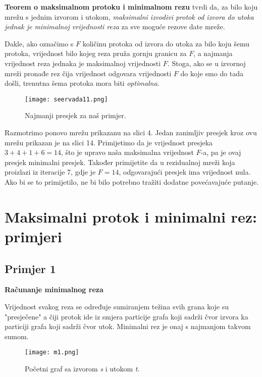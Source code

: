 \documentclass[11pt, a4paper]{article}
\begin{document}
	\textbf{Teorem o maksimalnom protoku i minimalnom rezu} tvrdi da, za bilo koju mrežu s jednim izvorom i utokom, \textit{maksimalni izvodivi protok od izvora do utoka jednak je minimalnoj vrijednosti reza} za sve moguće rezove date mreže.
	
	Dakle, ako označimo s $F$ količinu protoka od izvora do utoka za bilo koju šemu protoka, vrijednost bilo kojeg reza pruža gornju granicu za $F$, a najmanja vrijednost reza jednaka je maksimalnoj vrijednosti $F$. Stoga, ako se u izvornoj mreži pronađe rez čija vrijednost odgovara vrijednosti $F$ do koje smo do tada došli, trenutna šema protoka mora biti \textit{optimalna}.
	
	\begin{figure}[h]
		\centering
		\texttt{[image: seervada11.png]}
		\caption{Najmanji presjek za naš primjer.}
		\label{fig:slika14}
	\end{figure}
	
	Razmotrimo ponovo mrežu prikazanu na slici 4. Jedan zanimljiv presjek kroz ovu mrežu prikazan je na slici 14. Primijetimo da je vrijednost presjeka $3 + 4 + 1 + 6 = 14$, što je upravo naša maksimalna vrijednost $F$-a, pa je ovaj presjek minimalni presjek. Također primijetite da u rezidualnoj mreži koja proizlazi iz iteracije 7, gdje je $F = 14$, odgovarajući presjek ima vrijednost nula. Ako bi se to primijetilo, ne bi bilo potrebno tražiti dodatne povećavajuće putanje.
	
	\newpage
	\section{Maksimalni protok i minimalni rez: primjeri}
	
	\subsection{Primjer 1}
	
	\textbf{Računanje minimalnog reza}
	
	Vrijednost svakog reza se određuje sumiranjem težina svih grana koje su "presječene" a čiji protok ide iz smjera particije grafa koji sadrži čvor izvora ka particiji grafa koji sadrži čvor utok. Minimalni rez je onaj s najmanjom takvom sumom.
	
	\begin{figure}[h]
		\centering
		\texttt{[image: m1.png]}
		\caption{Početni graf sa izvorom \textit{s} i utokom \textit{t}.}
		\label{fig:m1}
	\end{figure}
	
\end{document}

